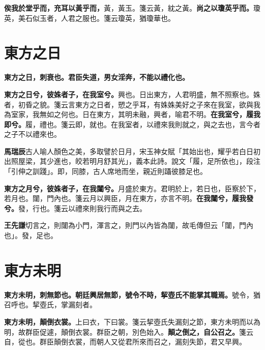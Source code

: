 \textbf{俟我於堂乎而，充耳以黃乎而，}{\footnotesize 黃，黃玉。箋云黃，紞之黃。}\textbf{尚之以瓊英乎而。}{\footnotesize 瓊英，美石似玉者，人君之服也。箋云瓊英，猶瓊華也。}

\section{東方之日}


\textbf{東方之日，刺衰也。君臣失道，男女淫奔，不能以禮化也。}

\textbf{東方之日兮，彼姝者子，在我室兮。}{\footnotesize 興也。日出東方，人君明盛，無不照察也。姝者，初昏之貌。箋云言東方之日者，愬之乎耳，有姝姝美好之子來在我室，欲與我為室家，我無如之何也。日在東方，其明未融，興者，喻君不明。}\textbf{在我室兮，履我即兮。}{\footnotesize 履，禮也。箋云即，就也。在我室者，以禮來我則就之，與之去也，言今者之子不以禮來也。}

\begin{quoting}\textbf{馬瑞辰}古人喻人顏色之美，多取譬於日月，宋玉神女賦「其始出也，耀乎若白日初出照屋梁，其少進也，皎若明月舒其光」，義本此詩。說文「履，足所依也」，段注「引伸之訓踐」。即，同膝，古人席地而坐，親近則躡彼膝足也。\end{quoting}

\textbf{東方之月兮，彼姝者子，在我闥兮。}{\footnotesize 月盛於東方。君明於上，若日也，臣察於下，若月也。闥，門內也。箋云月以興臣，月在東方，亦言不明。}\textbf{在我闥兮，履我發兮。}{\footnotesize 發，行也。箋云以禮來則我行而與之去。}

\begin{quoting}\textbf{王先謙}切言之，則闥為小門，渾言之，則門以內皆為闥，故毛傳但云「闥，門內也」。發，足也。\end{quoting}

\section{東方未明}


\textbf{東方未明，刺無節也。朝廷興居無節，號令不時，挈壺氏不能掌其職焉。}{\footnotesize 號令，猶召呼也。挈壺氏，掌漏刻者。}

\textbf{東方未明，顛倒衣裳。}{\footnotesize 上曰衣，下曰裳。箋云挈壺氏失漏刻之節，東方未明而以為明，故群臣促遽，顛倒衣裳。群臣之朝，別色始入。}\textbf{顛之倒之，自公召之。}{\footnotesize 箋云自，從也。群臣顛倒衣裳，而朝人又從君所來而召之，漏刻失節，君又早興。}

